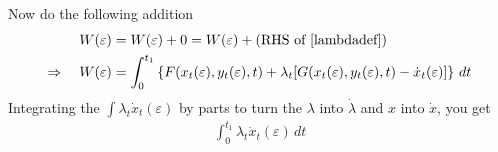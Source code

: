 \documentclass[12pt]{article}
\numberwithin{equation}{section} %
\theoremstyle{plain}
\theoremstyle{definition}
\theoremstyle{remark}
\begin{document}
Now do the following addition
\begin{align*}
  W(\varepsilon) &= W(\varepsilon) + 0
  = W(\varepsilon) +\text{(RHS of \ref{lambdadef})} \\
  \Rightarrow \quad
  W(\varepsilon) &=
  \int^{t_1}_0
  \left\{
  F(x_t(\varepsilon), y_t(\varepsilon), t)
  + \lambda_t [
    G(x_t(\varepsilon), y_t(\varepsilon), t) -
    \dot{x}_t(\varepsilon)
  ]
  \right\}\, dt
\end{align*}
Integrating the $\int \lambda_t \dot{x}_t(\varepsilon)$ by parts to turn
the $\lambda$ into $\dot{\lambda}$ and $x$ into $\dot{x}$, you get
\begin{align*}
  \int^{t_1}_0 \lambda_t \dot{x}_t(\varepsilon) \, dt
\end{align*}
\end{document}
